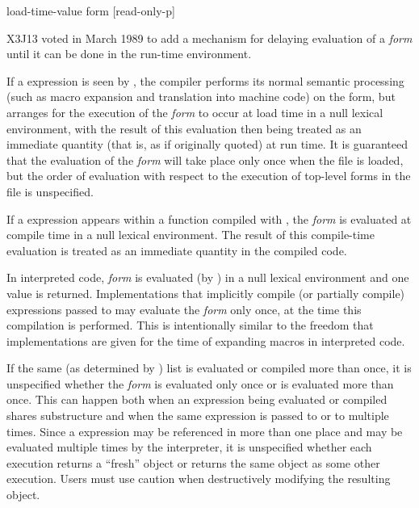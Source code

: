 \begin{newer}
\begin{defspec}
load-time-value form [read-only-p]

X3J13 voted in March 1989  to add
   a mechanism for delaying evaluation of a \emph{form}
   until it can be done in the run-time environment.  

   If a  expression is seen by , the compiler
   performs its normal semantic processing (such as macro expansion and
   translation into machine code) on the form, but arranges for the
   execution of the \emph{form} to occur at load time in a null
   lexical environment, with the result of this evaluation then being
   treated as an immediate quantity (that is, as if originally quoted)
   at run time.  It is guaranteed that 
   the evaluation of the \emph{form} will take place only once when the file is 
   loaded, but the order of evaluation with respect to the execution
   of top-level forms in the file is unspecified.

   If a  expression appears within a function compiled
   with , the \emph{form} is evaluated at compile time in a null lexical
   environment.  The result of this compile-time evaluation is treated as 
   an immediate quantity in the compiled code.  

   In interpreted code, \emph{form} is evaluated (by ) in a null
   lexical environment and one value is returned.  Implementations that
   implicitly compile (or partially compile) expressions passed to
    may evaluate the \emph{form} only once, at the time this
   compilation is performed.  This is intentionally similar to the
   freedom that implementations are given for the time of expanding
   macros in interpreted code.

  If the same (as determined by ) list  is
  evaluated or compiled more than once, it is unspecified whether the \emph{form}
  is evaluated only once or is evaluated more than once.  This can
  happen both when an expression being evaluated or compiled shares
  substructure and when the same expression is passed to  or to
   multiple times.  Since a  expression may be
  referenced in more than one place and may be evaluated multiple times
  by the interpreter, it is unspecified whether each execution returns
  a ``fresh'' object or returns the same object as some other execution.
  Users must use caution when destructively modifying the resulting
  object.


\end{defspec}
\end{newer}
